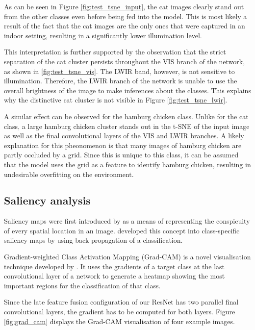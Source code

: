 \documentclass{l4proj}
\begin{document}
As can be seen in Figure \ref{fig:test_tsne_input}, the cat images clearly stand out from the other classes even before being fed into the model. This is most likely a result of the fact that the cat images are the only ones that were captured in an indoor setting, resulting in a significantly lower illumination level.

This interpretation is further supported by the observation that the strict separation of the cat cluster persists throughout the VIS branch of the network, as shown in \ref{fig:test_tsne_vis}. The LWIR band, however, is not sensitive to illumination. Therefore, the LWIR branch of the network is unable to use the overall brightness of the image to make inferences about the classes. This explains why the distinctive cat cluster is not visible in Figure \ref{fig:test_tsne_lwir}.

A similar effect can be observed for the hamburg chicken class. Unlike for the cat class, a large hamburg chicken cluster stands out in the t-SNE of the input image as well as the final convolutional layers of the VIS and LWIR branches. A likely explanation for this pheonomenon is that many images of hamburg chicken are partly occluded by a grid. Since this is unique to this class, it can be assumed that the model uses the grid as a feature to identify hamburg chicken, resulting in undesirable overfitting on the environment.


\subsection{Saliency analysis}

Saliency maps were first introduced by \citet{itti_model_1998} as a means of representing the conspicuity of every spatial location in an image. \citet{simonyan_deep_2014} developed this concept into class-specific saliency maps by using back-propagation of a classification.

Gradient-weighted Class Activation Mapping (Grad-CAM) is a novel visualisation technique developed by \citet{selvaraju_grad-cam_2020}. It uses the gradients of a target class at the last convolutional layer of a network to generate a heatmap showing the most important regions for the classification of that class.

Since the late feature fusion configuration of our ResNet has two parallel final convolutional layers, the gradient has to be computed for both layers. Figure \ref{fig:grad_cam} displays the Grad-CAM visualisation of four example images.
\end{document}
